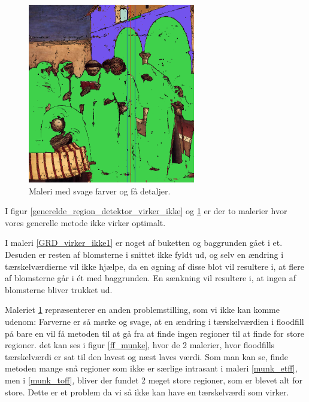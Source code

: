 \begin{figure}[!h]
	\begin{center}
	    \includegraphics[angle=0,width=0.65\textwidth]{afsnit/afprovning/billeder/thressholds/svage_farver/svage_detalier/floodfill/4-4.png}
	\end{center}    
	\caption{Maleri med svage farver og få detaljer.}
    \label{GRD_virker_ikke2}
\end{figure}

I figur \ref{generelde_region_detektor_virker_ikke} og
\ref{GRD_virker_ikke2} er der to malerier hvor
vores generelle metode ikke virker optimalt. 

I maleri \ref{GRD_virker_ikke1} er noget af buketten og baggrunden gået
i et. Desuden er resten af blomsterne i snittet ikke fyldt ud, og selv
en ændring i tærskelværdierne vil ikke hjælpe, da en øgning af disse
blot vil resultere i, at flere af blomsterne går i ét med baggrunden. En
sænkning vil resultere i, at ingen af blomsterne bliver trukket ud. 

Maleriet \ref{GRD_virker_ikke2} repræsenterer en anden problemstilling,
som vi ikke kan komme udenom: Farverne er så mørke og svage, at en
ændring i tærskelværdien i floodfill på bare en vil få metoden til at gå
fra at finde ingen regioner til at finde for store regioner. det kan ses
i figur \ref{ff_munke}, hvor de 2 malerier, hvor floodfills tærskelværdi
er sat til den lavest og næst laves værdi. Som man kan se, finde metoden
mange snå regioner som ikke er særlige intrasant i maleri
\ref{munk_etff}, men i \ref{munk_toff}, bliver der fundet 2 meget store
regioner, som er blevet alt for store. Dette er et problem da vi så ikke
kan have en tærskelværdi som virker.

